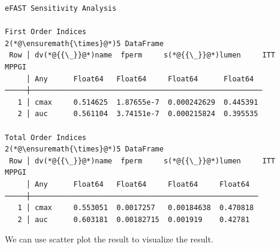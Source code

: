 \documentclass[12pt,a4paper]{article}
\begin{document}
\begin{lstlisting}
eFAST Sensitivity Analysis

First Order Indices
2(*@\ensuremath{\times}@*)5 DataFrame
 Row │ dv(*@{{\_}}@*)name  fperm     s(*@{{\_}}@*)lumen     ITT          MPPGI
     │ Any      Float64   Float64     Float64      Float64
─────┼──────────────────────────────────────────────────────
   1 │ cmax     0.514625  1.87655e-7  0.000242629  0.445391
   2 │ auc      0.561104  3.74151e-7  0.000215824  0.395535

Total Order Indices
2(*@\ensuremath{\times}@*)5 DataFrame
 Row │ dv(*@{{\_}}@*)name  fperm     s(*@{{\_}}@*)lumen     ITT         MPPGI
     │ Any      Float64   Float64     Float64     Float64
─────┼─────────────────────────────────────────────────────
   1 │ cmax     0.553051  0.0017257   0.00184638  0.470818
   2 │ auc      0.603181  0.00182715  0.001919    0.42781
\end{lstlisting}


We can use scatter plot the result to visualize the result.
\end{document}
